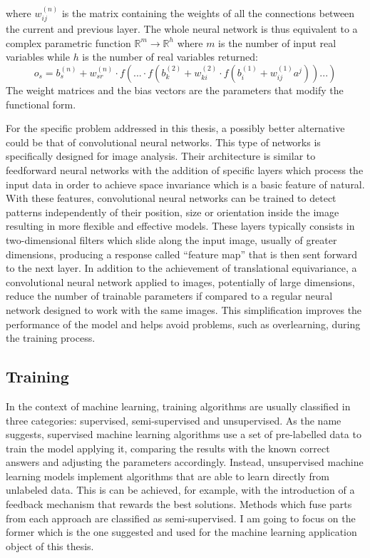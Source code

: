 \documentclass[a4paper,10pt]{report}
\begin{document}
where $w^{(n)}_{ij}$ is the matrix containing the weights of all the connections between the current and previous layer.
The whole neural network is thus equivalent to a complex parametric function $\mathbb{R}^m \rightarrow \mathbb{R}^h$ where $m$ is 
the number of input real variables while $h$ is the number of real variables returned:
\begin{equation}
    o_s = b_s^{(n)} + w^{(n)}_{sr} \cdot f( ... \cdot f( b_k^{(2)} + w_{ki}^{(2)} \cdot f(b_i^{(1)} + w_{ij}^{(1)}a^j)) ... )
\end{equation}
The weight matrices and the bias vectors are the parameters that modify the functional form.

For the specific problem addressed in this thesis, a possibly better alternative could be that of convolutional neural networks.
This type of networks is specifically designed for image analysis.
Their architecture is similar to feedforward neural networks with the addition
of specific layers which process the input data in order to achieve 
space invariance which is a basic feature of natural. With these features, convolutional neural networks can be trained
to detect patterns independently of their position, size or orientation inside the image
resulting in more flexible and effective models.
These layers typically consists in two-dimensional filters which slide along the input image, usually of greater dimensions, 
producing a response called ``feature map'' that is then sent forward to the next layer.
In addition to the achievement of translational equivariance, a convolutional neural network
applied to images, potentially of large dimensions, reduce the number of trainable parameters
if compared to a regular neural network designed to work with the same images. This simplification improves the
performance of the model and helps avoid problems, such as overlearning, during the training process.

\subsection{Training}

In the context of machine learning, training algorithms are usually classified in three categories: 
supervised, semi-supervised and unsupervised.
As the name suggests, supervised machine learning algorithms use a set of pre-labelled data to 
train the model applying it, comparing the results with the known correct answers and adjusting the parameters 
accordingly.
Instead, unsupervised machine learning models implement algorithms that are able to learn directly from 
unlabeled data. This is can be achieved, for example, with the introduction of a feedback mechanism that rewards
the best solutions.
Methods which fuse parts from each approach are classified as semi-supervised. I am going to focus on the
former which is the one suggested and used for the machine learning application object of this thesis.
\end{document}
